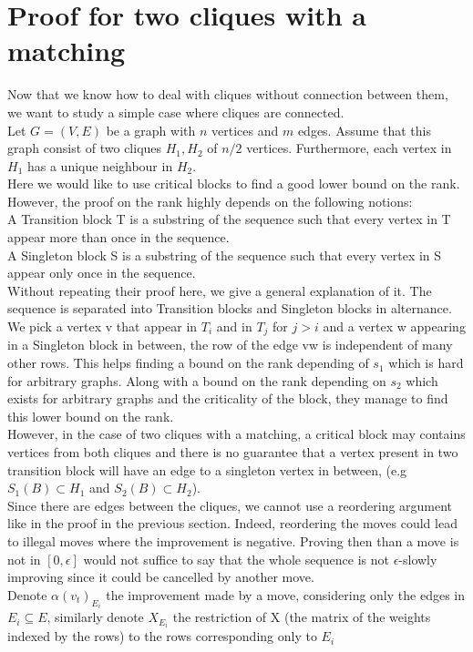 \section{Proof for two cliques with a matching}
Now that we know how to deal with cliques without connection between them, we want to study a simple case where cliques are connected. \\
Let $G = (V,E)$ be a graph with $n$ vertices and $m$ edges. Assume that this graph consist of two cliques $H_1, H_2$ of $n/2$ vertices. Furthermore, each vertex in $H_1$ has a unique neighbour in $H_2$. \\
Here we would like to use critical blocks to find a good lower bound on the rank. However, the proof on the rank \cite{angel2016local } highly depends on the following notions:\\
A Transition block T is a substring of the sequence such that every vertex in T appear more than once in the sequence. \\
A Singleton block S is a substring of the sequence  such that every vertex in S appear only once in the sequence. \\
Without repeating their proof here, we give a general explanation of it. The sequence is separated into Transition blocks and Singleton blocks in alternance. We pick a vertex v that appear in $T_i$ and in $T_j$ for $ j > i$ and a vertex w appearing in a Singleton block in between, the row of the edge vw is independent of many other rows. This helps finding a bound on the rank depending of $s_1$ which is hard for arbitrary graphs. Along with a bound on the rank depending on $s_2$ which exists for arbitrary graphs and the criticality of the block, they manage to find this lower bound on the rank.\\
However, in the case of two cliques with a matching, a critical block may contains vertices from both cliques and there is no guarantee that a vertex present in two transition block will have an edge to a singleton vertex in between, (e.g $S_1(B) \subset H_1$ and $S_2(B) \subset H_2$).\\ 
Since there are edges between the cliques, we cannot use a reordering argument like in the proof in the previous section. Indeed, reordering the moves could lead to illegal moves where the improvement is negative. Proving then than a move is not in $[0, \epsilon]$ would not suffice to say that the whole sequence is not $\epsilon$-slowly improving since it could be cancelled by another move.\\
Denote $\alpha(v_t)_{E_i}$ the improvement made by a move, considering only the edges in $E_i \subseteq E$, similarly denote $X_{E_i}$ the restriction of X (the matrix of the weights indexed by the rows) to the rows corresponding only to $E_i$ 

